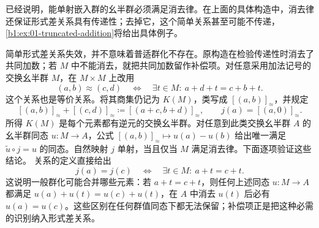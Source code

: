 \ProseParagraphBreak
{}已经说明，能单射嵌入群的幺半群必须满足消去律。在上面的具体构造中，消去律还保证形式差关系具有传递性；去掉它，这个简单关系甚至可能不传递，\cref{b1:ex:01-truncated-addition}将给出具体例子。

\ProseParagraphBreak
简单形式差关系失效，并不意味着普适群化不存在。原构造在检验传递性时消去了共同加数；若 \(M\) 中不能消去，就把共同加数留作补偿项。对任意采用加法记号的交换幺半群 \(M\)，在 \(M\times M\) 上改用
\[
	(a,b)\approx(c,d)\quad\Longleftrightarrow\quad \exists t\in M:\ a+d+t=c+b+t.
\]
这个关系也是等价关系。将其商集仍记为 \(K(M)\)，类写成 \([(a,b)]_{\approx}\)，并规定
\[
	[(a,b)]_{\approx}+[(c,d)]_{\approx} \coloneqq[(a+c,b+d)]_{\approx}, \qquad j(a)=[(a,0)]_{\approx}.
\]
所得 \(K(M)\) 是每个元素都有逆元的交换幺半群。对任意到此类交换幺半群 \(A\) 的幺半群同态 \(u:M\rightarrow A\)，公式 \([(a,b)]_{\approx}\mapsto u(a)-u(b)\) 给出唯一满足 \(\widetilde u\circ j=u\) 的同态。自然映射 \(j\) 单射，当且仅当 \(M\) 满足消去律。下面逐项验证这些结论。 关系的定义直接给出
\[
	j(a)=j(c)\quad\Longleftrightarrow\quad \exists t\in M:\ a+t=c+t.
\]
这说明一般群化可能合并哪些元素：若 \(a+t=c+t\)，则任何上述同态 \(u:M\rightarrow A\) 都满足 \(u(a)+u(t)=u(c)+u(t)\)，在 \(A\) 中消去 \(u(t)\) 后必有 \(u(a)=u(c)\)。这些区别在任何群值同态下都无法保留；补偿项正是把这种必需的识别纳入形式差关系。

